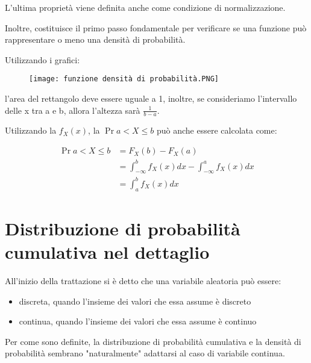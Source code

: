 L'ultima proprietà viene definita anche come condizione di normalizzazione. \newline 

Inoltre, costituisce il primo passo fondamentale per verificare se una funzione può rappresentare o meno una densità di probabilità. \newline 

Utilizzando i grafici: 

\begin{figure}[h]
    \centering
    \texttt{[image: funzione densità di probabilità.PNG]}
\end{figure} 

l'area del rettangolo deve essere uguale a 1, inoltre, se consideriamo l'intervallo delle x tra a e b, allora l'altezza sarà $\frac{1}{b - a}$. \newline 

Utilizzando la $f_X (x)$, la $\Pr{a < X \leq b}$ può anche essere calcolata come: 

{
    \Large 
    \begin{equation}
        \begin{split}
            \Pr{a < X \leq b} 
            &= 
            F_X (b) - F_X (a)
            \\ 
            &= 
            \int_{- \infty}^{b}
            f_X (x) dx 
            - 
            \int_{- \infty}^{a}
            f_X (x) dx 
            \\ 
            &= 
            \int_{a}^{b}
            f_X (x) dx 
        \end{split}
    \end{equation}
}

\newpage 

\section{Distribuzione di probabilità cumulativa nel dettaglio} 

All'inizio della trattazione si è detto che una variabile aleatoria può essere: 

\begin{itemize}
    \item discreta, quando l'insieme dei valori che essa assume è discreto 
    \item continua, quando l'insieme dei valori che essa assume è continuo 
\end{itemize}

Per come sono definite, la distribuzione di probabilità cumulativa e la densità di probabilità sembrano "naturalmente" 
adattarsi al caso di variabile continua.\newline 

